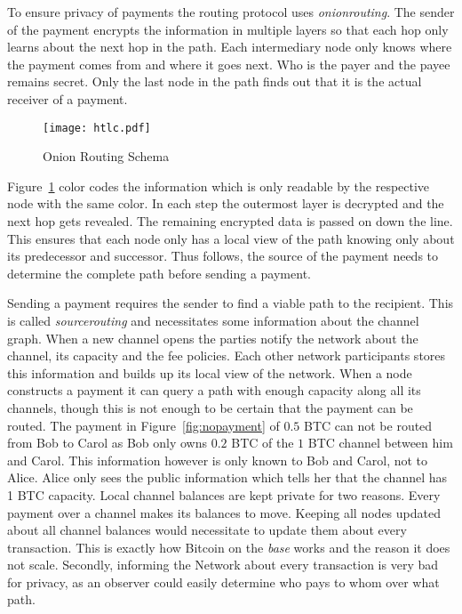 \documentclass[final]{fhnwreport}       %
\begin{document}
To ensure privacy of payments the routing protocol uses \emph{\gls{onionrouting}}. The sender of the payment encrypts the information in multiple layers so that each hop only learns about the next hop in the path. Each intermediary node only knows where the payment comes from and where it goes next. Who is the payer and the payee remains secret. Only the last node in the path finds out that it is the actual receiver of a payment.

\begin{figure}[H]
\centering
\texttt{[image: htlc.pdf]}
\caption{Onion Routing Schema}
\label{fig:onion}
\end{figure}

Figure~\ref{fig:onion} color codes the information which is only readable by the respective node with the same color. In each step the outermost layer is decrypted and the next hop gets revealed. The remaining encrypted data is passed on down the line. This ensures that each node only has a local view of the path knowing only about its predecessor and successor. Thus follows, the source of the payment needs to determine the complete path before sending a payment.

Sending a payment requires the sender to find a viable path to the recipient. This is called \emph{\gls{sourcerouting}} and necessitates some information about the channel graph. When a new channel opens the parties notify the network about the channel, its capacity and the fee policies. Each other network participants stores this information and builds up its local view of the network. When a node constructs a payment it can query a path with enough capacity along all its channels, though this is not enough to be certain that the payment can be routed. The payment in Figure~\ref{fig:nopayment} of $0.5$ BTC can not be routed from Bob to Carol as Bob only owns $0.2$ BTC of the $1$ BTC channel between him and Carol. This information however is only known to Bob and Carol, not to Alice. Alice only sees the public information which tells her that the channel has 1 BTC capacity. Local channel balances are kept private for two reasons. Every payment over a channel makes its balances to move. Keeping all nodes updated about all channel balances would necessitate to update them about every transaction. This is exactly how Bitcoin on the \emph{\gls{base}} works and the reason it does not scale. Secondly, informing the Network about every transaction is very bad for privacy, as an observer could easily determine who pays to whom over what path.
\end{document}
